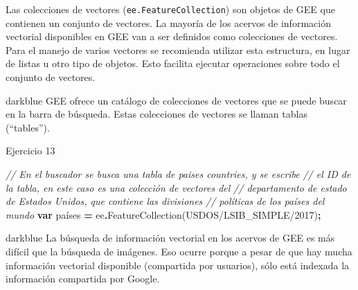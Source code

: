 \documentclass[
  12pt,
  letterpaper,
  twoside]{book}
\newenvironment{Shaded}{\begin{snugshade}}{\end{snugshade}}
\newcommand{\CommentTok}[1]{\textcolor[rgb]{0.56,0.35,0.01}{\textit{#1}}}
\newcommand{\FunctionTok}[1]{\textcolor[rgb]{0.00,0.00,0.00}{#1}}
\newcommand{\KeywordTok}[1]{\textcolor[rgb]{0.13,0.29,0.53}{\textbf{#1}}}
\newcommand{\NormalTok}[1]{#1}
\newcommand{\OperatorTok}[1]{\textcolor[rgb]{0.81,0.36,0.00}{\textbf{#1}}}
\newcommand{\StringTok}[1]{\textcolor[rgb]{0.31,0.60,0.02}{#1}}
\begin{document}
Las colecciones de vectores (\texttt{ee.FeatureCollection}) son objetos de GEE que contienen un conjunto de vectores. La mayoría de los acervos de información vectorial disponibles en GEE van a ser definidos como colecciones de vectores. Para el manejo de varios vectores se recomienda utilizar esta estructura, en lugar de listas u otro tipo de objetos. Esto facilita ejecutar operaciones sobre todo el conjunto de vectores.

\begin{bluebox2}

\begin{awesomeblock}{5pt}{\faLightbulb}{darkblue}
GEE ofrece un catálogo de colecciones de vectores que se puede buscar en la barra de búsqueda. Estas colecciones de vectores se llaman tablas (``tables'').

\end{awesomeblock}

\end{bluebox2}

Ejercicio 13

\begin{Shaded}
\begin{Highlighting}[]
\CommentTok{// En el buscador se busca una tabla de paises \textquotesingle{}countries\textquotesingle{}, y se escribe }
\CommentTok{// el ID de la tabla, en este caso es una colección de vectores del }
\CommentTok{// departamento de estado de Estados Unidos, que contiene las divisiones }
\CommentTok{// políticas de los países del mundo  }
\KeywordTok{var}\NormalTok{ países }\OperatorTok{=}\NormalTok{ ee}\OperatorTok{.}\FunctionTok{FeatureCollection}\NormalTok{(}\StringTok{\textquotesingle{}USDOS/LSIB\_SIMPLE/2017\textquotesingle{}}\NormalTok{)}\OperatorTok{;}
\end{Highlighting}
\end{Shaded}

\begin{bluebox2}

\begin{awesomeblock}{5pt}{\faLightbulb}{darkblue}
La búsqueda de información vectorial en los acervos de GEE es más difícil que la búsqueda de imágenes. Eso ocurre porque a pesar de que hay mucha información vectorial disponible (compartida por usuarios), sólo está indexada la información compartida por Google.

\end{awesomeblock}

\end{bluebox2}
\end{document}
